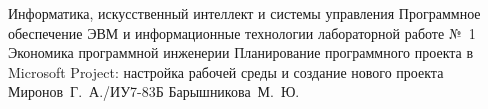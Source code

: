 \documentclass{bmstu}
\begin{document}
\makereporttitle
    {Информатика, искусственный интеллект и системы управления}
    {Программное обеспечение ЭВМ и информационные технологии}
    {лабораторной работе №~1}
    {Экономика программной инженерии}
    {Планирование программного проекта в Microsoft Project: настройка
рабочей среды и создание нового проекта}
    {}
    {Миронов~Г.~А./ИУ7-83Б}
    {Барышникова~М.~Ю.}






\end{document}
